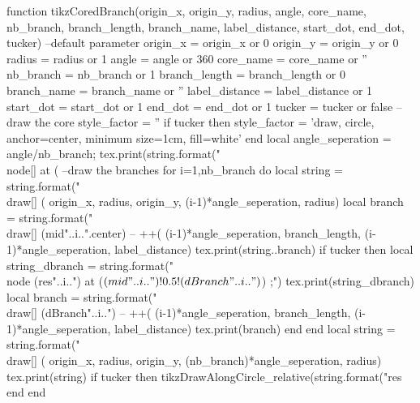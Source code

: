 \begin{luacode*}
	function tikzCoredBranch(origin_x, origin_y, radius, angle, core_name, nb_branch, branch_length, branch_name, label_distance, start_dot, end_dot, tucker)
		--default parameter
		origin_x = origin_x or 0
		origin_y = origin_y or 0
		radius = radius or 1
		angle = angle or 360
		core_name = core_name or ''
		nb_branch = nb_branch or 1
		branch_length = branch_length or 0
		branch_name = branch_name or ''
		label_distance = label_distance or 1
		start_dot = start_dot or 1
		end_dot = end_dot or 1
		tucker = tucker or false
		--draw the core
		style_factor = ''
		if tucker then
		  style_factor = 'draw, circle, anchor=center, minimum size=1cm, fill=white'
		end
		local angle_seperation = angle/nb_branch;
		tex.print(string.format("\\node[] at (%
		--draw the branches
		for i=1,nb_branch do
			local string = string.format("\\draw[] (%
			origin_x, radius, origin_y, (i-1)*angle_seperation, radius)
			local branch = string.format("\\draw[] (mid"..i..".center) -- ++(%
			(i-1)*angle_seperation, branch_length, (i-1)*angle_seperation, label_distance)
			tex.print(string..branch)
			if tucker then
			  local string_dbranch = string.format("\\node (res"..i..") at ($(mid"..i..")!0.5!(dBranch"..i..")$) {};")
			  tex.print(string_dbranch)
			  local branch = string.format("\\draw[] (dBranch"..i..") -- ++(%
			  (i-1)*angle_seperation, branch_length, (i-1)*angle_seperation, label_distance)
			  tex.print(branch)
			end
		end
		local string = string.format("\\draw[] (%
		origin_x, radius, origin_y, (nb_branch)*angle_seperation, radius)
		tex.print(string)
    if tucker then
		  tikzDrawAlongCircle_relative(string.format("res%
    end
	end
  

\end{luacode*}
